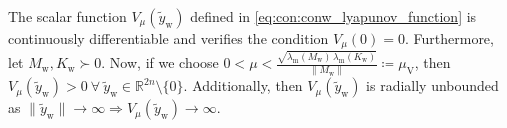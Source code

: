 \begin{lemma}\label{lemma:con:conw_lyapunov_candidate}
    The scalar function $V_\mu(\tilde{y}_\mathrm{w})$ defined in \eqref{eq:con:conw_lyapunov_function} is continuously differentiable and verifies the condition $V_\mu(0) = 0$.
    Furthermore, let $M_\mathrm{w}, K_\mathrm{w} \succ 0$.
    Now, if we choose $0 < \mu < \frac{\sqrt{\lambda_\mathrm{m}(M_\mathrm{w}) \, \lambda_\mathrm{m}\left(K_\mathrm{w}\right)}}{\lVert M_\mathrm{w} \rVert} \coloneqq \mu_\mathrm{V}$, then $V_\mu(\tilde{y}_\mathrm{w}) > 0 \: \forall \: \tilde{y}_\mathrm{w} \in \mathbb{R}^{2n} \setminus \{0 \}$. Additionally, then $V_\mu(\tilde{y}_\mathrm{w})$ is radially unbounded as $\lVert \tilde{y}_\mathrm{w} \rVert \rightarrow \infty \Rightarrow V_\mu(\tilde{y}_\mathrm{w}) \rightarrow \infty$.
\end{lemma}
